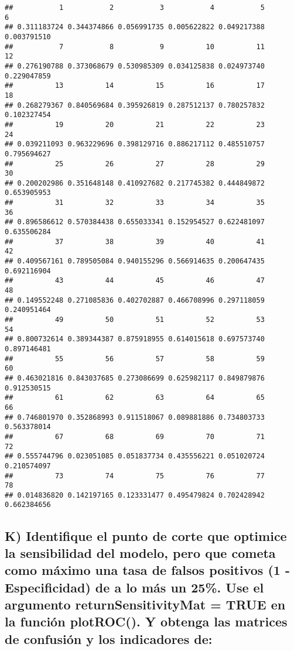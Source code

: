 \documentclass[
]{article}
\begin{document}
\begin{verbatim}
##           1           2           3           4           5           6 
## 0.311183724 0.344374866 0.056991735 0.005622822 0.049217388 0.003791510 
##           7           8           9          10          11          12 
## 0.276190788 0.373068679 0.530985309 0.034125838 0.024973740 0.229047859 
##          13          14          15          16          17          18 
## 0.268279367 0.840569684 0.395926819 0.287512137 0.780257832 0.102327454 
##          19          20          21          22          23          24 
## 0.039211093 0.963229696 0.398129716 0.886217112 0.485510757 0.795694627 
##          25          26          27          28          29          30 
## 0.200202986 0.351648148 0.410927682 0.217745382 0.444849872 0.653905953 
##          31          32          33          34          35          36 
## 0.896586612 0.570384438 0.655033341 0.152954527 0.622481097 0.635506284 
##          37          38          39          40          41          42 
## 0.409567161 0.789505084 0.940155296 0.566914635 0.200647435 0.692116904 
##          43          44          45          46          47          48 
## 0.149552248 0.271085836 0.402702887 0.466708996 0.297118059 0.240951464 
##          49          50          51          52          53          54 
## 0.800732614 0.389344387 0.875918955 0.614015618 0.697573740 0.897146481 
##          55          56          57          58          59          60 
## 0.463021816 0.843037685 0.273086699 0.625982117 0.849879876 0.912530515 
##          61          62          63          64          65          66 
## 0.746801970 0.352868993 0.911518067 0.089881886 0.734803733 0.563378014 
##          67          68          69          70          71          72 
## 0.555744796 0.023051085 0.051837734 0.435556221 0.051020724 0.210574097 
##          73          74          75          76          77          78 
## 0.014836820 0.142197165 0.123331477 0.495479824 0.702428942 0.662384656
\end{verbatim}

\hypertarget{k-identifique-el-punto-de-corte-que-optimice-la-sensibilidad-del-modelo-pero-que-cometa-como-muxe1ximo-una-tasa-de-falsos-positivos-1---especificidad-de-a-lo-muxe1s-un-25.-use-el-argumento-returnsensitivitymat-true-en-la-funciuxf3n-plotroc.-y-obtenga-las-matrices-de-confusiuxf3n-y-los-indicadores-de}{%
\subsection{K) Identifique el punto de corte que optimice la
sensibilidad del modelo, pero que cometa como máximo una tasa de falsos
positivos (1 - Especificidad) de a lo más un 25\%. Use el argumento
returnSensitivityMat = TRUE en la función plotROC(). Y obtenga las
matrices de confusión y los indicadores
de:}\label{k-identifique-el-punto-de-corte-que-optimice-la-sensibilidad-del-modelo-pero-que-cometa-como-muxe1ximo-una-tasa-de-falsos-positivos-1---especificidad-de-a-lo-muxe1s-un-25.-use-el-argumento-returnsensitivitymat-true-en-la-funciuxf3n-plotroc.-y-obtenga-las-matrices-de-confusiuxf3n-y-los-indicadores-de}}
\end{document}

